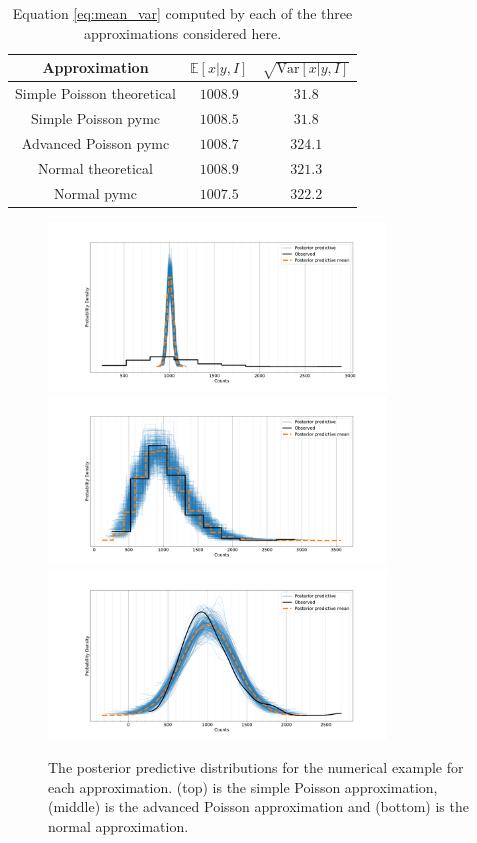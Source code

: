 \begin{example}
	\begin{table}[h]
		\centering
		\begin{tabular}{|c|c|c|}
			\hline
			\multicolumn{1}{|c|}{Approximation} & \multicolumn{1}{c|}{$\mathbb{E}[x|y,I]$} & \multicolumn{1}{c|}{$\sqrt{\text{Var}[x|y,I]}$} \\
			\hline\hline
			Simple Poisson theoretical & $1008.9$ & $31.8$ \\
			Simple Poisson pymc & $1008.5$ & $31.8$ \\
			\hline
			Advanced Poisson pymc & $1008.7$ & $324.1$ \\
			\hline
			Normal theoretical & $1008.9$ & $321.3$\\
			Normal pymc & $1007.5$ & $322.2$\\
			\hline
		\end{tabular}
		\caption{Equation \eqref{eq:mean_var} computed by each of the three approximations considered here.}
		\label{tab:1}
	\end{table}
	
	\begin{figure}[H]
		\centering
		\includegraphics[width = 0.8\textwidth]{figures/pymc_poisson.pdf}
		\includegraphics[width = 0.8\textwidth]{figures/pymc_negbin.pdf}
		\includegraphics[width = 0.8\textwidth]{figures/pymc_normal.pdf}
		\caption{The posterior predictive distributions for the numerical example for each approximation. (top) is the simple Poisson approximation, (middle) is the advanced Poisson approximation and (bottom) is the normal approximation.}
		\label{fig:q2}
	\end{figure}
	

\end{example}
